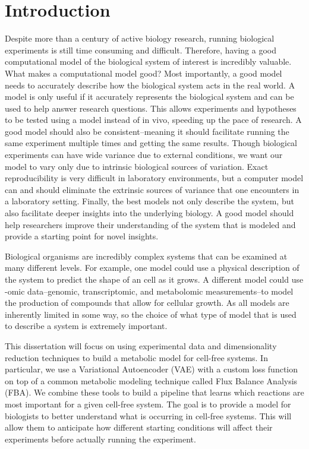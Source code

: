 \chapter{Introduction}
\setcounter{page}{1} 

Despite more than a century of active biology research, running biological experiments is still time consuming and difficult.
Therefore, having a good computational model of the biological system of interest is incredibly valuable.
What makes a computational model good?
Most importantly, a good model needs to accurately describe how the biological system acts in the real world.
A model is only useful if it accurately represents the biological system and can be used to help answer research questions.
This allows experiments and hypotheses to be tested using a model instead of in vivo, speeding up the pace of research.
A good model should also be consistent--meaning it should facilitate running the same experiment multiple times and getting the same results.
Though biological experiments can have wide variance due to external conditions, we want our model to vary only due to intrinsic biological sources of variation.
Exact reproducibility is very difficult in laboratory environments, but a computer model can and should eliminate the extrinsic sources of variance that one encounters in a laboratory setting.
Finally, the best models not only describe the system, but also facilitate deeper insights into the underlying biology.
A good model should help researchers improve their understanding of the system that is modeled and provide a starting point for novel insights.

Biological organisms are incredibly complex systems that can be examined at many different levels.
For example, one model could use a physical description of the system to predict the shape of an cell as it grows.
A different model could use -omic data--genomic, transcriptomic, and metabolomic measurements--to model the production of compounds that allow for cellular growth.
As all models are inherently limited in some way, so the choice of what type of model that is used to describe a system is extremely important.

This dissertation will focus on using experimental data and dimensionality reduction techniques to build a metabolic model for cell-free systems.
In particular, we use a Variational Autoencoder (VAE) with a custom loss function on top of a common metabolic modeling technique called Flux Balance Analysis  (FBA).
We combine these tools to build a pipeline that learns which reactions are most important for a given cell-free system.
The goal is to provide a model for biologists to better understand what is occurring in cell-free systems.
This will allow them to anticipate how different starting conditions will affect their experiments before actually running the experiment.

